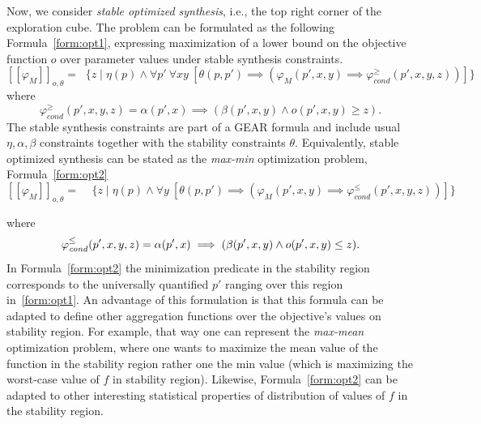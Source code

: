 \documentclass[a4paper,parskip=half]{article} %
\newcommand*\eqdef=
\newcommand*\regmax[2]{[[{#1}]]_{#2}}
\newcommand*\objv{o}
\begin{document}
Now, we consider \emph{stable optimized synthesis}, i.e., the top right corner of the exploration cube.
The problem can be formulated as the following Formula~\eqref{form:opt1}, expressing maximization of a lower bound  
on the objective function $\objv$ over parameter values under stable synthesis constraints.
%
\begin{equation}\label{form:opt1}
\regmax{\varphi_M}{\objv,\theta}
\eqdef\mathop{\max\limits_{p}} \{z \mid\eta(p) \wedge
    \forall p'~
    \forall x y~[
    \theta(p,p') \implies
    (\varphi_M(p',x,y)  \implies 
     \varphi_{\mathit{cond}}^{\geq}(p',x,y,z))
    ]\}
\end{equation}
where
\[
\varphi_{\mathit{cond}}^{\geq}(p',x,y,z)
\eqdef \alpha(p',x) \implies (\beta(p',x,y) \wedge \objv(p',x,y) \geq z).
\]
%
The stable synthesis constraints are part of a GEAR formula and include usual $\eta, \alpha, \beta$ constraints together with the stability constraints $\theta$.
Equivalently, stable optimized synthesis can be stated as the \emph{max-min} optimization problem, Formula~\eqref{form:opt2}
\begin{equation}\label{form:opt2}
\regmax{\varphi_M}{\objv,\theta}
\eqdef
\mathop{\max\limits_{p}} \mathop{\min\limits_{x, p'}}
\{ z \mid \eta(p) \wedge
    \forall y~[
     \theta(p,p') \implies
     (\varphi_M(p',x,y)  \implies  \varphi_{\mathit{cond}}^{\leq}(p',x,y,z))]\}
\end{equation}

where \[
\varphi_{\mathit{cond}}^{\leq}(p',x,y,z)
\eqdef\alpha(p',x) \implies (\beta(p',x,y) \wedge \objv(p',x,y) \leq z)\text.\]
In Formula~\eqref{form:opt2} the minimization predicate in the stability region corresponds to the universally quantified $p'$ ranging over this region in~\eqref{form:opt1}.
An advantage of this formulation is that this formula can be adapted to define other aggregation functions over the objective's values on stability region.
For example, that way one can represent the \emph{max-mean} optimization problem, where one wants to maximize the mean value of the function in the stability region rather one the min value (which is maximizing the worst-case value of $f$ in stability region).
Likewise, Formula~\eqref{form:opt2} can be adapted to other interesting statistical properties of distribution of values of $f$ in the stability region.
\end{document}
